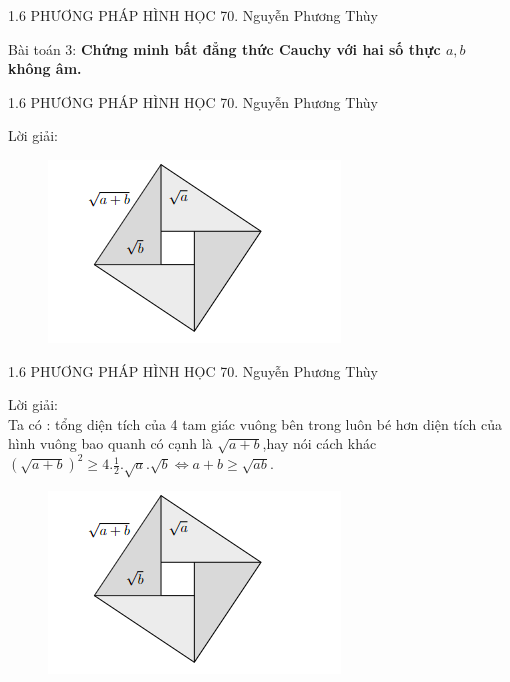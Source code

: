 \begin{frame}{1.6 PHƯƠNG PHÁP HÌNH HỌC
\hspace{3cm}  70. Nguyễn Phương Thùy} 
\begin{block}{Bài toán 3:}
\textbf{Chứng minh bất đẳng thức Cauchy với hai số thực $a,b $ không âm.}\\
\end{block}
\end{frame}

\begin{frame}{1.6 PHƯƠNG PHÁP HÌNH HỌC
\hspace{3cm}  70. Nguyễn Phương Thùy} 
\begin{block}{Lời giải:}
\begin{figure}
    \centering
    \includegraphics[width=0.7\linewidth]{anh2.png}
\end{figure}
\end{block}
\end{frame}


\begin{frame}{1.6 PHƯƠNG PHÁP HÌNH HỌC
\hspace{3cm}  70. Nguyễn Phương Thùy} 
\begin{block}{Lời giải:}\\Ta có : tổng diện tích của 4 tam giác vuông bên trong luôn bé hơn diện tích của hình vuông bao quanh có cạnh là $\sqrt{a+b}$,hay nói cách khác\\$(\sqrt{a+b})^2 \ge 4.\frac{1}{2}.\sqrt{a}.\sqrt{b} \Leftrightarrow a+b \ge \sqrt{ab} .$
\begin{figure}
    \raggedleft
    \includegraphics[width=0.5\linewidth]{anh2.png}
\end{figure}
\end{block}
\end{frame}




